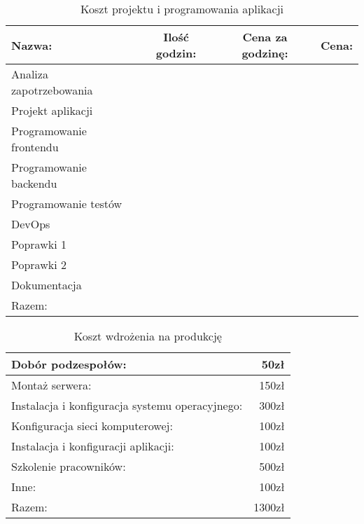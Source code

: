 \documentclass[12pt,a4paper]{article}
\begin{document}
		\begin{table}[!hbp]
			\center
			\begin{tabular}{|l|c|c|r|}
				\hline
				Nazwa: & Ilość godzin: & Cena za godzinę: & Cena: \\
				\hline
				Analiza zapotrzebowania & \ & \ & \\
				\hline
				Projekt aplikacji & \ & \ & \\
				\hline
				Programowanie frontendu & \ & \ & \\
				\hline
				Programowanie backendu & \ & \ & \\
				\hline
				Programowanie testów & \ & \ & \\
				\hline
				DevOps & \ & \ & \ \\
				\hline
				Poprawki 1 & \ & \ & \ \\
				\hline
				Poprawki 2 & \ & \ & \ \\
				\hline
				Dokumentacja & \ & \ & \ \\
				\hline
				\multicolumn{3}{|l|}{Razem:} & \ \\
				\hline
			\end{tabular}
			\caption{Koszt projektu i programowania aplikacji}
			\label{Koszt projektu i programowania aplikacji}
		\end{table}		
				
		\begin{table}[!hbp]
			\center
			\begin{tabular}{|l|r|}
				\hline
				Dobór podzespołów: & 50zł \\				
				\hline
				Montaż serwera: & 150zł \\
				\hline
				Instalacja i konfiguracja systemu operacyjnego: & 300zł \\
				\hline
				Konfiguracja sieci komputerowej: & 100zł \\
				\hline
				Instalacja i konfiguracji aplikacji: & 100zł \\
				\hline
				Szkolenie pracowników: & 500zł \\
				\hline
				Inne: & 100zł \\
				\hline
				Razem: & 1300zł\\
				\hline
			\end{tabular}
			\caption{Koszt wdrożenia na produkcję}
			\label{Koszt wdrożenie na produkcję}
		\end{table}
		
\end{document}
